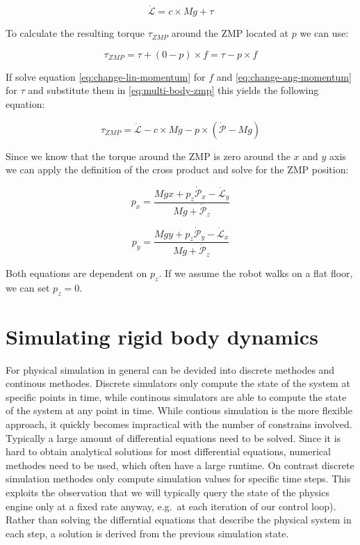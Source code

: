 \documentclass[english,ngerman]{KITreprt}
\newcommand{\clr}[2]{{\color{#1}{#2}}}
\newcommand{\todo}[1]{\marginpar{\clr{red}{#1}}}
\begin{document}
\begin{equation} \label{eq:change-ang-momentum}
\dot{\mathcal{L}} = c \times Mg + \tau
\end{equation}

To calculate the resulting torque $\tau_{ZMP}$ around the ZMP located at
$p$ we can use:

\begin{equation} \label{eq:multi-body-zmp}
\tau_{ZMP} = \tau + (0 - p) \times f = \tau - p \times f
\end{equation}

If solve equation \ref{eq:change-lin-momentum} for $f$ and
\ref{eq:change-ang-momentum} for $\tau$ and substitute them in
\ref{eq:multi-body-zmp} this yields the following equation:

\begin{equation}
\tau_{ZMP} = \dot{\mathcal{L}} - c \times M g - p \times (\dot{\mathcal{P}} - Mg)
\end{equation}

Since we know that the torque around the ZMP is zero around the $x$ and
$y$ axis we can apply the definition of the cross product and solve for
the ZMP position:

\begin{equation}
p_x = \frac{Mgx + p_z \dot{\mathcal{P}}_x - \dot{\mathcal{L}}_y}{Mg + \dot{\mathcal{P}}_z}
\end{equation}

\begin{equation}
p_y = \frac{Mgy + p_z \dot{\mathcal{P}}_y - \dot{\mathcal{L}}_x}{Mg + \dot{\mathcal{P}}_z}
\end{equation}

Both equations are dependent on $p_z$. If we assume the robot walks on a
flat floor, we can set $p_z = 0$.

\todo{plot of difference in multi-body zmp and cart table zmp while walking}

\section{Simulating rigid body
dynamics}\label{simulating-rigid-body-dynamics}

For physical simulation in general can be devided into discrete methodes
and continous methodes. Discrete simulators only compute the state of
the system at specific points in time, while continous simulators are
able to compute the state of the system at any point in time. While
contious simulation is the more flexible approach, it quickly becomes
impractical with the number of constrains involved. Typically a large
amount of differential equations need to be solved. Since it is hard to
obtain analytical solutions for most differential equations, numerical
methodes need to be used, which often have a large runtime. On contrast
discrete simulation methodes only compute simulation values for specific
time steps. This exploits the observation that we will typically query
the state of the physics engine only at a fixed rate anyway, e.g.~at
each iteration of our control loop). Rather than solving the differntial
equations that describe the physical system in each step, a solution is
derived from the previous simulation state.
\end{document}
